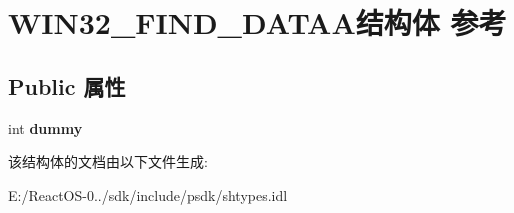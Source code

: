 \hypertarget{struct_w_i_n32___f_i_n_d___d_a_t_a_a}{}\section{W\+I\+N32\+\_\+\+F\+I\+N\+D\+\_\+\+D\+A\+T\+A\+A结构体 参考}
\label{struct_w_i_n32___f_i_n_d___d_a_t_a_a}
\subsection*{Public 属性}
\begin{DoxyCompactItemize}
\item 
\mbox{\label{struct_w_i_n32___f_i_n_d___d_a_t_a_a_aa60e8ccb78c610fdc943b5f878adfb51}} 
int {\bfseries dummy}
\end{DoxyCompactItemize}


该结构体的文档由以下文件生成\+:\begin{DoxyCompactItemize}
\item 
E\+:/\+React\+O\+S-\/0../sdk/include/psdk/shtypes.\+idl\end{DoxyCompactItemize}
